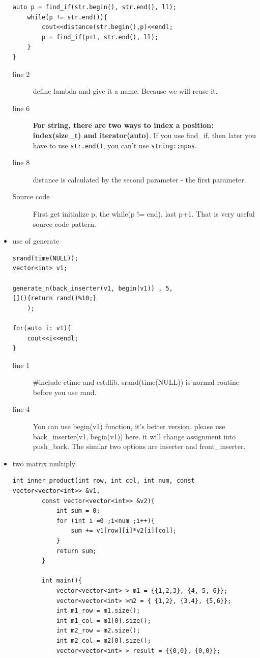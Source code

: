 \documentclass[a4paper,11pt,twoside]{book}
\begin{document}
\begin{itemize}
\begin{lstlisting}[numbers=none]
	auto p = find_if(str.begin(), str.end(), ll);
	while(p != str.end()){
		cout<<distance(str.begin(),p)<<endl;
		p = find_if(p+1, str.end(), ll);
	}
}	
\end{lstlisting}
\begin{description}
	\item[line 2] define lambda and give it a name. Because we will reuse it.
	\item[line 6] \textbf{For string, there are two ways to index a position: index(size\_t) and iterator(auto)}. If you use find\_if, then later you have to use \texttt{str.end()}, you can't use \texttt{string::npos}.
	\item[line 8] distance is calculated by the second parameter - the first parameter.
	\item[Source code] First get initialize p, the while(p != end), last p+1. That is very useful source code pattern. 
\end{description}


\item use of generate
\begin{lstlisting}[numbers=none]
srand(time(NULL));
vector<int> v1;

generate_n(back_inserter(v1, begin(v1)) , 5,
[](){return rand()%10;} 
	);	
		
for(auto i: v1){
	cout<<i<<endl;
}		
\end{lstlisting}
	\begin{description}
		\item[line 1] \#include ctime and cstdlib. srand(time(NULL)) is normal routine before you use rand.
		\item[line 4] You can use begin(v1) function, it's better version. please use back\_inserter(v1, begin(v1)) here. it will change assignment into push\_back. The similar two options are inserter and front\_inserter. 
		
	\end{description}
	
	
	
\item two matrix multiply
	\begin{lstlisting}[numbers=none]
		int inner_product(int row, int col, int num, const vector<vector<int>> &v1, 
		const vector<vector<int>> &v2){
			int sum = 0;
			for (int i =0 ;i<num ;i++){
				sum += v1[row][i]*v2[i][col];
			}
			return sum;
		}
		
		int main(){
			vector<vector<int> > m1 = {{1,2,3}, {4, 5, 6}};
			vector<vector<int> >m2 = { {1,2}, {3,4}, {5,6}};
			int m1_row = m1.size();
			int m1_col = m1[0].size();
			int m2_row = m2.size();
			int m2_col = m2[0].size();
			vector<vector<int> > result = {{0,0}, {0,0}};
			

\end{lstlisting}
\end{itemize}
\end{document}
